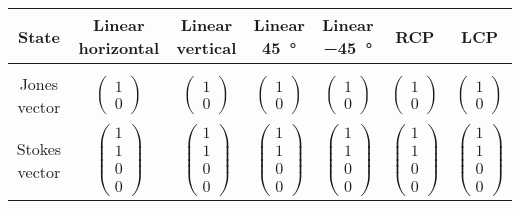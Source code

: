 \documentclass{article}
\begin{document}
    \begin{tabular}{c | c c c c c c}
        \toprule
        State & Linear horizontal & Linear vertical & Linear \SI{+45}{\degree} & Linear \SI{-45}{\degree} & RCP & LCP \\
        \midrule\\
        Jones vector &  
        $\begin{pmatrix} 1 \\ 0 \end{pmatrix}$ &
        $\begin{pmatrix} 1 \\ 0 \end{pmatrix}$ &
        $\begin{pmatrix} 1 \\ 0 \end{pmatrix}$ &
        $\begin{pmatrix} 1 \\ 0 \end{pmatrix}$ &
        $\begin{pmatrix} 1 \\ 0 \end{pmatrix}$ &
        $\begin{pmatrix} 1 \\ 0 \end{pmatrix}$ \\ 
        Stokes vector & 
        $\begin{pmatrix} 1 \\ 1 \\ 0 \\ 0 \end{pmatrix}$ & 
        $\begin{pmatrix} 1 \\ 1 \\ 0 \\ 0 \end{pmatrix}$ & 
        $\begin{pmatrix} 1 \\ 1 \\ 0 \\ 0 \end{pmatrix}$ & 
        $\begin{pmatrix} 1 \\ 1 \\ 0 \\ 0 \end{pmatrix}$ & 
        $\begin{pmatrix} 1 \\ 1 \\ 0 \\ 0 \end{pmatrix}$ & 
        $\begin{pmatrix} 1 \\ 1 \\ 0 \\ 0 \end{pmatrix}$ 
    \end{tabular}
\end{document}
